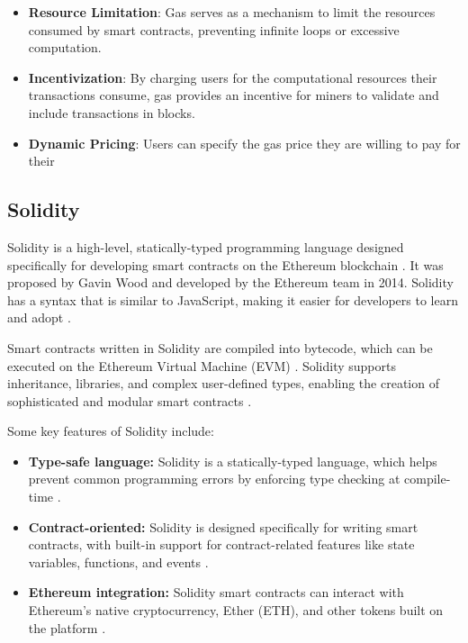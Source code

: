 \begin{itemize}
    \item \textbf{Resource Limitation}: Gas serves as a mechanism to limit the resources consumed by smart contracts, preventing infinite loops or excessive computation.
    \item \textbf{Incentivization}: By charging users for the computational resources their transactions consume, gas provides an incentive for miners to validate and include transactions in blocks.
    \item \textbf{Dynamic Pricing}: Users can specify the gas price they are willing to pay for their
\end{itemize}

\subsection{Solidity}
Solidity is a high-level, statically-typed programming language designed specifically for developing smart contracts on the Ethereum blockchain \cite{solidityDocs}. It was proposed by Gavin Wood \cite{wood2014ethereum} and developed by the Ethereum team in 2014. Solidity has a syntax that is similar to JavaScript, making it easier for developers to learn and adopt \cite{antonopoulos2018mastering}.

Smart contracts written in Solidity are compiled into bytecode, which can be executed on the Ethereum Virtual Machine (EVM) \cite{wood2014ethereum}. Solidity supports inheritance, libraries, and complex user-defined types, enabling the creation of sophisticated and modular smart contracts \cite{antonopoulos2018mastering}.

Some key features of Solidity include:
\begin{itemize}
\item \textbf{Type-safe language:} Solidity is a statically-typed language, which helps prevent common programming errors by enforcing type checking at compile-time \cite{solidityDocs}.
\item \textbf{Contract-oriented:} Solidity is designed specifically for writing smart contracts, with built-in support for contract-related features like state variables, functions, and events \cite{solidityDocs}.
\item \textbf{Ethereum integration:} Solidity smart contracts can interact with Ethereum's native cryptocurrency, Ether (ETH), and other tokens built on the platform \cite{wood2014ethereum}.
\end{itemize}

